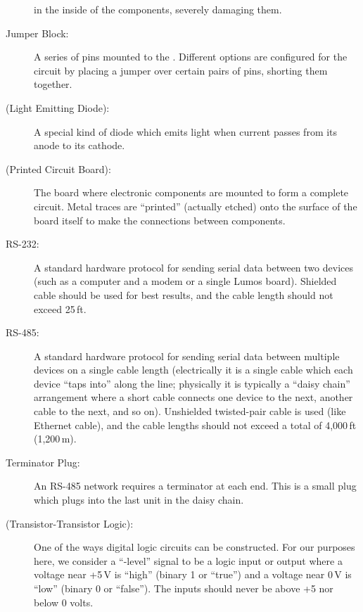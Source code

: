 \documentclass[letterpaper,twoside,onecolumn,openright,final]{memoir}
\begin{document}
\begin{description}
		in the inside of the components, severely damaging them.
	\item[Jumper Block:]
		A series of pins mounted to the .  Different options are configured for the
		circuit by placing a jumper over certain pairs of pins, shorting them together.
	\item[\acronym{LED} (Light Emitting Diode):]
		A special kind of diode which emits light when current passes from its anode to its cathode.
	\item[\acronym{PCB} (Printed Circuit Board):]
		The board where electronic components are mounted to form a complete circuit.  Metal
		traces are ``printed'' (actually etched) onto the surface of the board itself to make the
		connections between components.
	\item[RS-232:]
		A standard hardware protocol for sending serial data between two devices (such as a computer
		and a modem or a single Lumos board).  Shielded cable should be used for best results, and
		the cable length should not exceed 25\,ft.
	\item[RS-485:]
		A standard hardware protocol for sending serial data between multiple devices on a single
		cable length (electrically it is a single cable which each device ``taps into'' along the
		line; physically it is typically a ``daisy chain'' arrangement where a short cable connects
		one device to the next, another cable to the next, and so on). Unshielded twisted-pair cable
		is used (like Ethernet cable), and the cable lengths should not exceed a total of 4,000\,ft
		(1,200\,m).
	\item[Terminator Plug:]
		An RS-485 network requires a terminator at each end.  This is a small plug which plugs into
		the last unit in the daisy chain.
	\item[\acronym{TTL} (Transistor-Transistor Logic):] One of the ways digital logic circuits can be
		constructed.  For our purposes here, we consider a ``-level'' signal to be a
		logic input or output where a voltage near +5\,V is ``high'' (binary 1 or ``true'') and a
		voltage near 0\,V is ``low'' (binary 0 or ``false'').  The inputs should never be above
		+5 nor below 0 volts.
\end{description}

 

\indexintoc
\printindex
\clearpage


\end{document}
